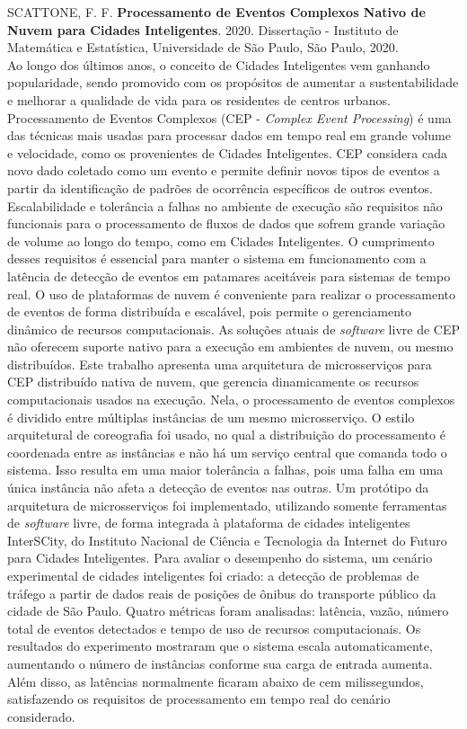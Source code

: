 \documentclass[11pt,twoside,a4paper]{book}
\begin{document}
\noindent SCATTONE, F. F. \textbf{Processamento de Eventos Complexos Nativo de Nuvem para Cidades Inteligentes}. 2020. Dissertação %
- Instituto de Matemática e Estatística, Universidade de São Paulo, São Paulo, 2020.\\
Ao longo dos últimos anos, o conceito de Cidades Inteligentes vem ganhando popularidade, sendo promovido com os propósitos de aumentar a sustentabilidade e melhorar a qualidade de vida para os residentes de centros urbanos. Processamento de Eventos Complexos (CEP - \emph{Complex Event Processing}) é uma das técnicas mais usadas para processar dados em tempo real em grande volume e velocidade, como os provenientes de Cidades Inteligentes. CEP considera cada novo dado coletado como um evento e permite definir novos tipos de eventos a partir da identificação de padrões de ocorrência específicos de outros eventos. Escalabilidade e tolerância a falhas no ambiente de execução são requisitos não funcionais para o processamento de fluxos de dados que sofrem grande variação de volume ao longo do tempo, como em Cidades Inteligentes. O cumprimento desses requisitos é essencial para manter o sistema em funcionamento com a latência de detecção de eventos em patamares aceitáveis para sistemas de tempo real. O uso de plataformas de nuvem é conveniente para realizar o processamento de eventos de forma distribuída e escalável, pois permite o gerenciamento dinâmico de recursos computacionais. 
As soluções atuais de \textit{software} livre de CEP não oferecem suporte nativo para a execução em ambientes de nuvem, ou mesmo distribuídos.
Este trabalho apresenta uma arquitetura de microsserviços para CEP distribuído nativa de nuvem, que gerencia dinamicamente os recursos computacionais usados na execução. Nela, o processamento de eventos complexos é dividido entre múltiplas instâncias de um mesmo microsserviço. O estilo arquitetural de coreografia foi usado, no qual a distribuição do processamento é coordenada entre as instâncias e não há um serviço central que comanda todo o sistema. Isso resulta em uma maior tolerância a falhas, pois uma falha em uma única instância não afeta a detecção de eventos nas outras. Um protótipo da arquitetura de microsserviços foi implementado, utilizando somente ferramentas de \textit{software} livre, de forma integrada à plataforma de cidades inteligentes InterSCity, do Instituto Nacional de Ciência e Tecnologia da Internet do Futuro para Cidades Inteligentes. Para avaliar o desempenho do sistema, um cenário experimental de cidades inteligentes foi criado: a detecção de problemas de tráfego a partir de dados reais de posições de ônibus do transporte público da cidade de São Paulo. Quatro métricas foram analisadas: latência, vazão, número total de eventos detectados e tempo de uso de recursos computacionais. Os resultados do experimento mostraram que o sistema escala automaticamente, aumentando o número de instâncias conforme sua carga de entrada aumenta. 
Além disso, as latências normalmente ficaram abaixo de
cem milissegundos, satisfazendo os requisitos de processamento em tempo real do cenário considerado.
\end{document}
